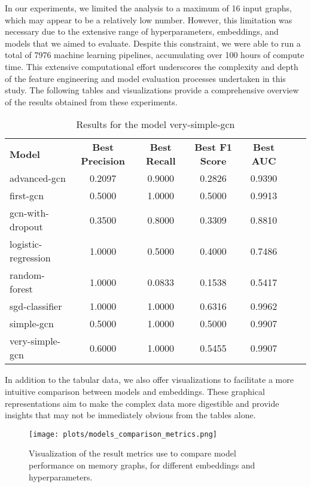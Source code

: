 In our experiments, we limited the analysis to a maximum of 16 input graphs, which may appear to be a relatively low number. However, this limitation was necessary due to the extensive range of hyperparameters, embeddings, and models that we aimed to evaluate. Despite this constraint, we were able to run a total of 7976 machine learning pipelines, accumulating over 100 hours of compute time. This extensive computational effort underscores the complexity and depth of the feature engineering and model evaluation processes undertaken in this study. The following tables and visualizations provide a comprehensive overview of the results obtained from these experiments.

\begin{table}[H]
    \centering
    \caption{Results for the model very-simple-gcn}
    \begin{tabular}{lcccccc}
      \textbf{Model}  & \textbf{Best Precision} & \textbf{Best Recall} & \textbf{Best F1 Score} & \textbf{Best AUC} \\
        advanced-gcn & 0.2097 & 0.9000 & 0.2826 & 0.9390 \\
        first-gcn & 0.5000 & 1.0000 & 0.5000 & 0.9913 \\
        gcn-with-dropout & 0.3500 & 0.8000 & 0.3309 & 0.8810 \\
        logistic-regression & 1.0000 & 0.5000 & 0.4000 & 0.7486 \\
        random-forest & 1.0000 & 0.0833 & 0.1538 & 0.5417 \\
        sgd-classifier & 1.0000 & 1.0000 & 0.6316 & 0.9962 \\
        simple-gcn & 0.5000 & 1.0000 & 0.5000 & 0.9907 \\
        very-simple-gcn & 0.6000 & 1.0000 & 0.5455 & 0.9907 \\
    \end{tabular}
\end{table}

In addition to the tabular data, we also offer visualizations to facilitate a more intuitive comparison between models and embeddings. These graphical representations aim to make the complex data more digestible and provide insights that may not be immediately obvious from the tables alone.

\begin{figure}[H]\label{results:compare:models:full}
    \centering
    \texttt{[image: plots/models\_comparison\_metrics.png]}
    \caption{Visualization of the result metrics use to compare model performance on memory graphs, for different embeddings and hyperparameters.}
\end{figure}

